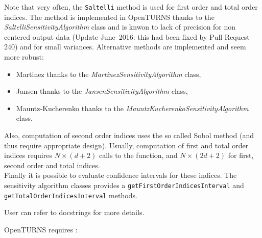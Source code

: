 Note that very often, the \texttt{Saltelli} method is used for first order and total order indices. The method is implemented in OpenTURNS thanks to the {\itshape SaltelliSensitivityAlgorithm} class and is knwon to lack of precision for non centered output data (Update June~2016: this had been fixed by Pull Request 240) and for small variances. Alternative methods are implemented and seem more robust:
\begin{itemize}
\item Martinez thanks to the {\itshape MartinezSensitivityAlgorithm} class,
\item Jansen thanks to the {\itshape JansenSensitivityAlgorithm} class,
\item Mauntz-Kucherenko thanks to the {\itshape MauntzKucherenkoSensitivityAlgorithm} class.
\end{itemize}
Also, computation of second order indices uses the so called Sobol method (and thus require appropriate design). Usually, computation of first and total order indices requires $N \times (d+2)$ calls to the function, and $N \times (2d+2)$ for first, second order and total indices.\\
Finally it is possible to evaluate confidence intervals for these indices. The sensitivity algorithm classes provides a \texttt{getFirstOrderIndicesInterval} and \texttt{getTotalOrderIndicesInterval} methods.


User can refer to docstrings for more details.

OpenTURNS requires :

